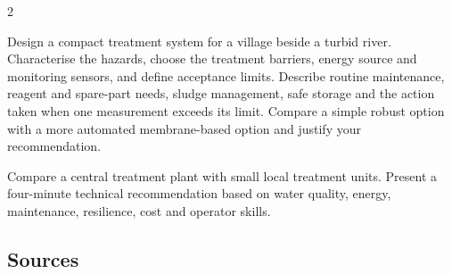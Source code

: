 \begin{multicols}{2}
\begin{engineeringchallenge}
Design a compact treatment system for a village beside a turbid river. Characterise the hazards,
choose the treatment barriers, energy source and monitoring sensors, and define acceptance limits.
Describe routine maintenance, reagent and spare-part needs, sludge management, safe storage and the
action taken when one measurement exceeds its limit. Compare a simple robust option with a more
automated membrane-based option and justify your recommendation.
\end{engineeringchallenge}

\begin{speaking}
Compare a central treatment plant with small local treatment units. Present a four-minute technical
recommendation based on water quality, energy, maintenance, resilience, cost and operator skills.
\end{speaking}
\end{multicols}

\subsection*{Sources}
